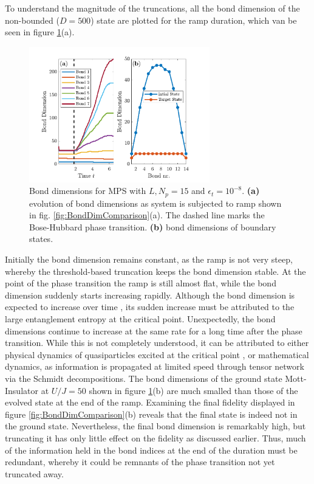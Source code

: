 To understand the magnitude of the truncations, all the bond dimension of the non-bounded ($D=500$) state are plotted for the ramp duration, which van be seen in figure \ref{fig:BondDimEvolution}(a).
\begin{figure}[h!]
    \centering
    \includegraphics[width=0.7\textwidth]{Figures/BondDim/BondDimEvolution.pdf}
    \caption{Bond dimensions for MPS with $L, N_p = 15$ and $\epsilon_t = 10^{-8}$. \textbf{(a)} evolution of bond dimensions as system is subjected to ramp shown in fig. \ref{fig:BondDimComparison}(a). The dashed line marks the Bose-Hubbard phase transition. \textbf{(b)} bond dimensions of boundary states.}
    \label{fig:BondDimEvolution}
\end{figure}
Initially the bond dimension remains constant, as the ramp is not very steep, whereby the threshold-based truncation keeps the bond dimension stable. At the point of the phase transition the ramp is still almost flat, while the bond dimension suddenly starts increasing rapidly. Although the bond dimension is expected to increase over time \cite{Daley2004}, its sudden increase must be attributed to the large entanglement entropy at the critical point. Unexpectedly, the bond dimensions continue to increase at the same rate for a long time after the phase transition. While this is not completely understood, it can be attributed to either physical dynamics of quasiparticles excited at the critical point \cite{Braun2015}, or mathematical dynamics, as information is propagated at limited speed through tensor network via the Schmidt decompositions.
The bond dimensions of the ground state Mott-Insulator at $U/J = 50$ shown in figure \ref{fig:BondDimEvolution}(b) are much smalled than those of the evolved state at the end of the ramp. Examining the final fidelity displayed in figure \ref{fig:BondDimComparison}(b) reveals that the final state is indeed not in the ground state. Nevertheless, the final bond dimension is remarkably high, but truncating it has only little effect on the fidelity as discussed earlier. Thus, much of the information held in the bond indices at the end of the duration must be redundant, whereby it could be remnants of the phase transition not yet truncated away.

